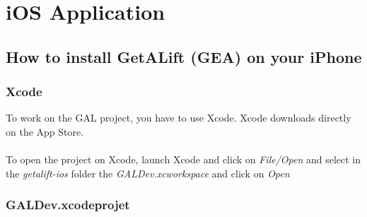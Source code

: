 \chapter{iOS Application}

\section{How to install GetALift (GEA) on your iPhone}

\subsection{Xcode}

To work on the GAL project, you have to use Xcode. Xcode downloads directly on the App Store.
\\\\
To open the project on Xcode, launch Xcode and click on \textit{File/Open} and select in the  \textit{getalift-ios} folder the \textit{GALDev.xcworkspace} and click on \textit{Open}

\subsection{GALDev.xcodeprojet}

